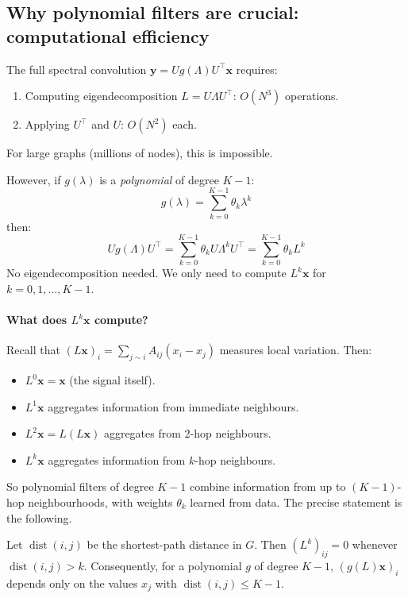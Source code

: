 \begin{notechapter}
\subsection{Why polynomial filters are crucial: computational efficiency}

The full spectral convolution $\mathbf{y} = U g(\Lambda) U^\top \mathbf{x}$ requires:
\begin{enumerate}
\item Computing eigendecomposition $L = U\Lambda U^\top$: $O(N^3)$ operations.
\item Applying $U^\top$ and $U$: $O(N^2)$ each.
\end{enumerate}
For large graphs (millions of nodes), this is impossible.

However, if $g(\lambda)$ is a \emph{polynomial} of degree $K-1$:
\[
g(\lambda) = \sum_{k=0}^{K-1} \theta_k \lambda^k
\]
then:
\[
U g(\Lambda) U^\top = \sum_{k=0}^{K-1} \theta_k U\Lambda^k U^\top = \sum_{k=0}^{K-1} \theta_k L^k
\]
No eigendecomposition needed. We only need to compute $L^k \mathbf{x}$ for
$k = 0, 1, \ldots, K-1$.

\paragraph{What does $L^k \mathbf{x}$ compute?}
Recall that $(L\mathbf{x})_i = \sum_{j \sim i} A_{ij}(x_i - x_j)$ measures
local variation. Then:
\begin{itemize}
\item $L^0\mathbf{x} = \mathbf{x}$ (the signal itself).
\item $L^1\mathbf{x}$ aggregates information from immediate neighbours.
\item $L^2\mathbf{x} = L(L\mathbf{x})$ aggregates from 2-hop neighbours.
\item $L^k\mathbf{x}$ aggregates information from $k$-hop neighbours.
\end{itemize}

So polynomial filters of degree $K-1$ combine information from up to
$(K-1)$-hop neighbourhoods, with weights $\theta_k$ learned from data. The precise statement is the following.

\begin{lemma}\label{dft-to-gnn:lem:local}
Let $\operatorname{dist}(i,j)$ be the shortest-path distance in $G$. Then $(L^k)_{ij} = 0$ whenever $\operatorname{dist}(i,j) > k$. Consequently, for a polynomial $g$ of degree $K-1$, $(g(L)\mathbf{x})_i$ depends only on the values $x_j$ with $\operatorname{dist}(i,j) \le K-1$.
\end{lemma}


\end{notechapter}
